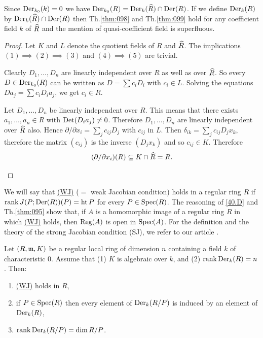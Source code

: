 \documentclass[../main]{subfiles}
\begin{document}
\begin{remark}
Since $\operatorname{Der}_{k_0}(k) = 0$ we have $\operatorname{Der}_{k_0}(R) = \operatorname{Der}_k(\widehat{R}) \cap \operatorname{Der}(R)$. If we define $\operatorname{Der}_k(R)$ by $\operatorname{Der}_k(\widehat{R}) \cap \operatorname{Der}(R)$ then Th.\ref{thm:098} and Th.\ref{thm:099} hold for any coefficient field $k$ of $\widehat{R}$ and the mention of quasi-coefficient field is superfluous.
\end{remark}

\begin{proof}
Let $K$ and $L$ denote the quotient fields of $R$ and $\widehat{R}$. The implications $(1) \implies (2) \implies (3)$ and $(4) \implies (5)$ are trivial.
\begin{implyenumerate}
    \item[$(3) \implies (4)$] Clearly $D_1, \ldots, D_n$ are linearly independent over $R$ as well as over $\widehat{R}$. So every $D \in \operatorname{Der}_{k_0}(R)$ can be written as $D = \sum c_i D_i$ with $c_i \in L$. Solving the equations $D a_j = \sum c_i D_i a_j$, we get $c_i \in R$. 
    \item[$(5) \implies (1)$] Let $D_1, \ldots, D_n$ be linearly independent over $R$. This means that there exists $a_1, \ldots, a_n \in R$ with $\operatorname{Det}(D_i a_j) \ne 0$. Therefore $D_1, \ldots, D_n$ are linearly independent over $\widehat{R}$ also. Hence $\partial/\partial x_i = \sum_j c_{ij} D_j$ with $c_{ij}$ in $L$. Then $\delta_{ik} = \sum_j c_{ij} D_j x_k$, therefore the matrix $(c_{ij})$ is the inverse $(D_j x_k)$ and so $c_{ij} \in K$. Therefore \[(\partial/\partial x_i)(R) \subseteq K \cap \widehat{R} = R.\]
\end{implyenumerate}
\end{proof}

\newparagraph We will say that \hyperref[40.F]{(WJ)} ($=$ weak Jacobian condition) holds in a regular ring $R$ if $\operatorname{rank} J(P; \operatorname{Der}(R))(P) = \operatorname{ht} P$ for every $P \in \operatorname{Spec}(R)$. The reasoning of \ref{40.D} and Th.\ref{thm:095} show that, if $A$ is a homomorphic image of a regular ring $R$ in which \hyperref[40.F]{(WJ)} holds, then $\operatorname{Reg}(A)$ is open in $\operatorname{Spec}(A)$. For the definition and the theory of the strong Jacobian condition (SJ), we refer to our article \cite{MATSUMURA1977279}.

\begin{theorem}\label{thm:100}
Let $(R, \mathfrak{m}, K)$ be a regular local ring of dimension $n$ containing a field $k$ of characteristic $0$. Assume that (1) $K$ is algebraic over $k$, and (2) $\operatorname{rank} \operatorname{Der}_k(R) = n$. Then: 
\begin{enumerate}
    \item[i)] \hyperref[40.F]{(WJ)} holds in $R$,
    \item[ii)] if $P \in \operatorname{Spec}(R)$ then every element of $\operatorname{Der}_k(R/P)$ is induced by an element of $\operatorname{Der}_k(R)$,
    \item[iii)] $\operatorname{rank} \operatorname{Der}_k(R/P) = \operatorname{dim} R/P$.
\end{enumerate}
\end{theorem}
\end{document}
